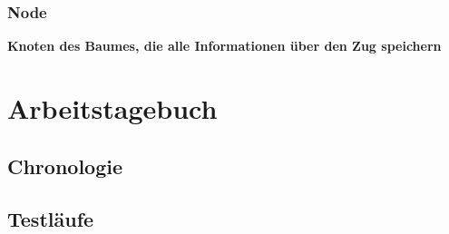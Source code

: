 \documentclass{article}
\begin{document}
\subsubsection{Node}
\textbf{Knoten des Baumes, die alle Informationen über den Zug speichern}


\newpage
\section{Arbeitstagebuch}\label{section-diary}

\subsection{Chronologie}
\subsection{Testläufe}


\end{document}
